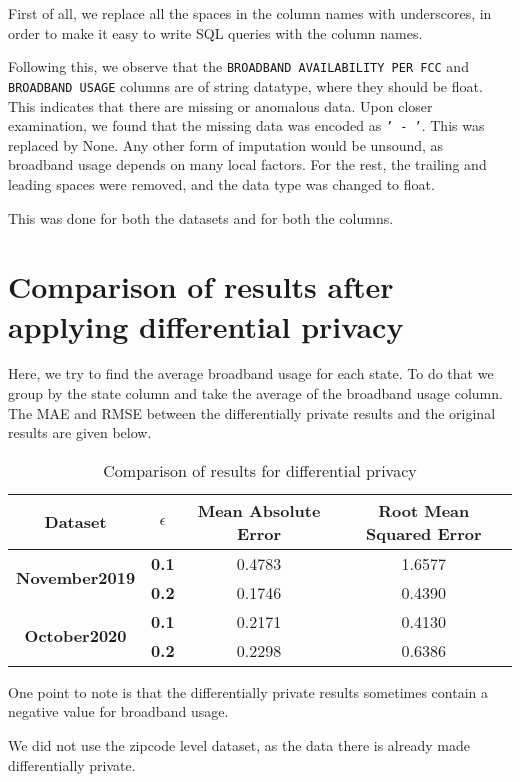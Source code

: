 \documentclass[12pt]{scrartcl}
\theoremstyle{plain}
\theoremstyle{definition}
\theoremstyle{question}
\begin{document}
First of all, we replace all the spaces in the column names with underscores, in order to make it easy to write SQL queries with the column names.

Following this, we observe that the \texttt{BROADBAND AVAILABILITY PER FCC} and \texttt{BROADBAND USAGE} columns are of string datatype, where they should be float. This indicates that there are missing or anomalous data. Upon closer examination, we found that the missing data was encoded as \texttt{' -   '}. This was replaced by None. Any other form of imputation would be unsound, as broadband usage depends on many local factors. For the rest, the trailing and leading spaces were removed, and the data type was changed to float. 

This was done for both the datasets and for both the columns.

\section{Comparison of results after applying differential privacy}

Here, we try to find the average broadband usage for each state. To do that we group by the state column and take the average of the broadband usage column. The MAE and RMSE between the differentially private results and the original results are given below.

\begin{table}[H]
    \centering
    \begin{tabular}{c|c|c|c}
        \hline
        \textbf{Dataset} & \(\epsilon\) & \textbf{Mean Absolute Error} & \textbf{Root Mean Squared Error} \\ \hline
        \multirow{2}{*}{\textbf{November2019}} & \textbf{0.1} & 0.4783 & 1.6577 \\ \cline{2-4} 
                                               & \textbf{0.2} & 0.1746 & 0.4390 \\ \hline
        \multirow{2}{*}{\textbf{October2020}}  & \textbf{0.1} & 0.2171 & 0.4130 \\ \cline{2-4} 
                                               & \textbf{0.2} & 0.2298 & 0.6386 \\ \hline
        \end{tabular}
    \caption{Comparison of results for differential privacy}
    \label{tab:my-table}
    \end{table}

One point to note is that the differentially private results sometimes contain a negative value for broadband usage. 

We did not use the zipcode level dataset, as the data there is already made differentially private.
\end{document}
